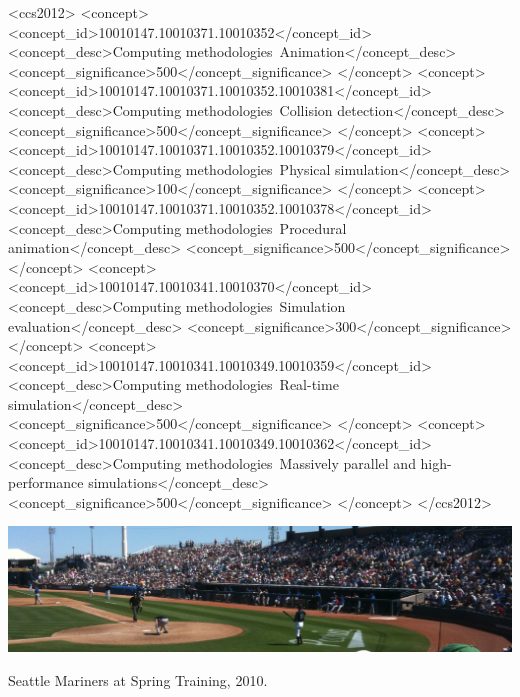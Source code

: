 \documentclass[sigconf]{acmart}
\begin{document}
\begin{CCSXML}
<ccs2012>
<concept>
<concept_id>10010147.10010371.10010352</concept_id>
<concept_desc>Computing methodologies~Animation</concept_desc>
<concept_significance>500</concept_significance>
</concept>
<concept>
<concept_id>10010147.10010371.10010352.10010381</concept_id>
<concept_desc>Computing methodologies~Collision detection</concept_desc>
<concept_significance>500</concept_significance>
</concept>
<concept>
<concept_id>10010147.10010371.10010352.10010379</concept_id>
<concept_desc>Computing methodologies~Physical simulation</concept_desc>
<concept_significance>100</concept_significance>
</concept>
<concept>
<concept_id>10010147.10010371.10010352.10010378</concept_id>
<concept_desc>Computing methodologies~Procedural animation</concept_desc>
<concept_significance>500</concept_significance>
</concept>
<concept>
<concept_id>10010147.10010341.10010370</concept_id>
<concept_desc>Computing methodologies~Simulation evaluation</concept_desc>
<concept_significance>300</concept_significance>
</concept>
<concept>
<concept_id>10010147.10010341.10010349.10010359</concept_id>
<concept_desc>Computing methodologies~Real-time simulation</concept_desc>
<concept_significance>500</concept_significance>
</concept>
<concept>
<concept_id>10010147.10010341.10010349.10010362</concept_id>
<concept_desc>Computing methodologies~Massively parallel and high-performance simulations</concept_desc>
<concept_significance>500</concept_significance>
</concept>
</ccs2012>
\end{CCSXML}



\begin{teaserfigure}
  \includegraphics[width=\textwidth]{sampleteaser}
  \caption{Seattle Mariners at Spring Training, 2010.}
  \label{fig:teaser}
\end{teaserfigure}
\end{document}
